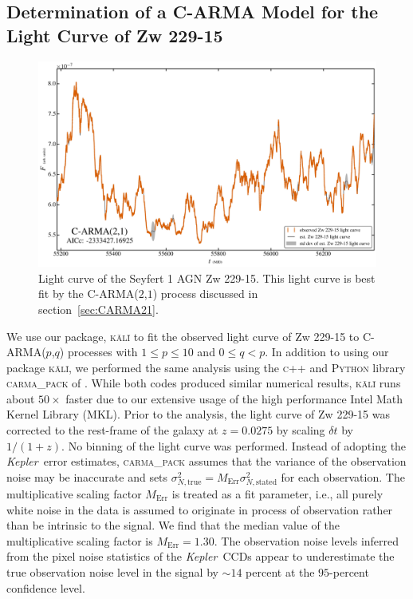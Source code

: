 \documentclass[a4paper,fleqn,usenatbib]{mnras}
\newcommand{\Kepler}{\textit{Kepler~}}
\begin{document}
\subsection[C-ARMA Model for Zw 229-15]{Determination of a C-ARMA Model for the Light Curve of Zw 229-15}\label{sec:Zw229-15CARMA}

\begin{figure}
    \includegraphics[width=\textwidth]{Figure2.jpg}
    \caption{Light curve of the Seyfert 1 AGN Zw 229-15. This light curve is best fit by the C-ARMA($2$,$1$) process discussed in section~\ref{sec:CARMA21}.}
    \label{fig:Zw229-15_LC}
\end{figure}

We use our package, \textsc{k\={a}l\={i}} to fit the observed light curve of Zw 229-15 to C-ARMA($p$,$q$) processes with $1 \leq p \leq 10$ and $0 \leq q < p$. In addition to using our package \textsc{k\={a}l\={i}}, we performed the same analysis using the \textsc{c++} and \textsc{Python} library \textsc{carma\_pack} of \citet{Kelly14}. While both codes produced similar numerical results, \textsc{k\={a}l\={i}} runs about $50 \times$ faster due to our extensive usage of the high performance Intel Math Kernel Library (MKL). Prior to the analysis, the light curve of Zw 229-15 was corrected to the rest-frame of the galaxy at $z = 0.0275$ by scaling $\delta t$ by $1/(1+z)$. No binning of the light curve was performed. Instead of adopting the \Kepler error estimates, \textsc{carma\_pack} assumes that the variance of the observation noise may be inaccurate and sets $\sigma^{2}_{N,\mathrm{true}} = M_{\mathrm{Err}} \sigma^{2}_{N,\mathrm{stated}}$ for each observation. The multiplicative scaling factor $M_{\mathrm{Err}}$ is treated as a fit parameter, i.e., all purely white noise in the data is assumed to originate in process of observation rather than be intrinsic to the signal. We find that the median value of the multiplicative scaling factor is $M_{\mathrm{Err}} = 1.30$. The observation noise levels inferred from the pixel noise statistics of the \Kepler CCDs appear to underestimate the true observation noise level in the signal by $\sim 14$ percent at the $95$-percent confidence level.
\end{document}
